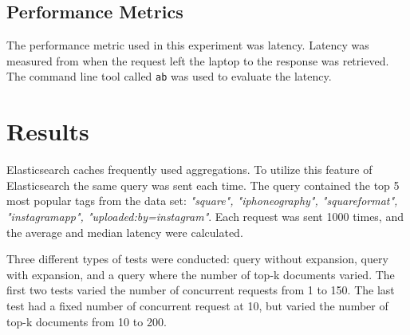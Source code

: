 \subsection{Performance Metrics}
The performance metric used in this experiment was latency.
Latency was measured from when the request left the laptop to the response was retrieved.
The command line tool called \texttt{ab} \cite{apache-benchmark} was used to evaluate the latency.




\section{Results}
Elasticsearch caches frequently used aggregations.
To utilize this feature of Elasticsearch the same query was sent each time.
The query contained the top 5 most popular tags from the data set: \textit{"square", "iphoneography", "squareformat", "instagramapp", "uploaded:by=instagram"}.
Each request was sent 1000 times, and the average and median latency were calculated.

Three different types of tests were conducted: query without expansion, query with expansion, and a query where the number of top-k documents varied.
The first two tests varied the number of concurrent requests from 1 to 150.
The last test had a fixed number of concurrent request at 10,
but varied the number of top-k documents from 10 to 200.


